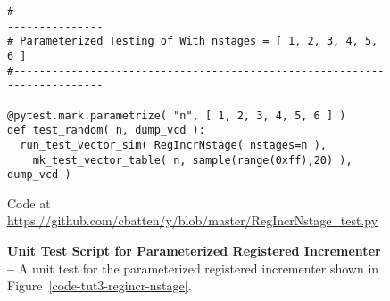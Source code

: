 \begin{figure}
\begin{lstlisting}[xleftmargin={0.9in}]
#-------------------------------------------------------------------------
# Parameterized Testing of With nstages = [ 1, 2, 3, 4, 5, 6 ]
#-------------------------------------------------------------------------

@pytest.mark.parametrize( "n", [ 1, 2, 3, 4, 5, 6 ] )
def test_random( n, dump_vcd ):
  run_test_vector_sim( RegIncrNstage( nstages=n ),
    mk_test_vector_table( n, sample(range(0xff),20) ), dump_vcd )
\end{lstlisting}

  \centerline{\small Code at
    \url{https://github.com/cbatten/y/blob/master/RegIncrNstage_test.py}}

  \caption{\textbf{Unit Test Script for Parameterized Registered
      Incrementer --} A unit test for the parameterized registered
    incrementer shown in Figure~\ref{code-tut3-regincr-nstage}.}
  \label{code-tut3-regincr-nstage-test}

\end{figure}


